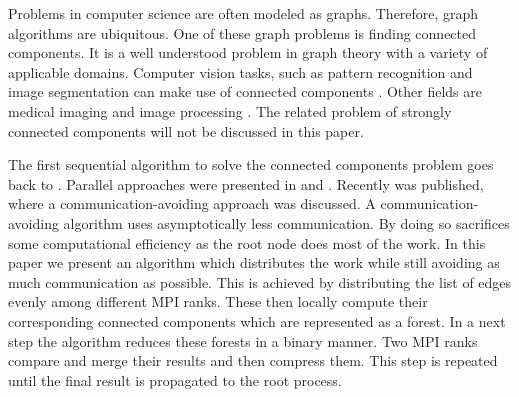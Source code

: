 

Problems in computer science are often modeled as graphs. Therefore, graph algorithms are
ubiquitous. One of these graph problems is finding connected components. It is a well understood
problem in graph theory with a variety of applicable domains. Computer vision tasks, such as
pattern recognition and image segmentation \cite{683775} can make use of connected components
\cite{Wilson:2006:RCV:1166253.1166292}. Other fields are medical imaging \cite{UDUPA1990355} and
image processing \cite{Ambrosio2001}. The related problem of strongly connected components will not
be discussed in this paper.

The first sequential algorithm to solve the connected components problem goes back to
\cite{Hopcroft}. Parallel approaches were presented in \cite{MANOHAR1989133} and
\cite{Han:1990:EFP:79147.214077}. Recently \cite{comm_avoiding} was published, where a
communication-avoiding approach was discussed. A communication-avoiding algorithm uses
asymptotically less communication. By doing so \cite{comm_avoiding} sacrifices some computational
efficiency as the root node does most of the work. In this paper we present an algorithm which
distributes the work while still avoiding as much communication as possible. This is achieved by
distributing the list of edges evenly among different MPI ranks. These then locally compute their
corresponding connected components which are represented as a forest. In a next step the algorithm
reduces these forests in a binary manner. Two MPI ranks compare and merge their results and then
compress them. This step is repeated until the final result is propagated to the root process.



